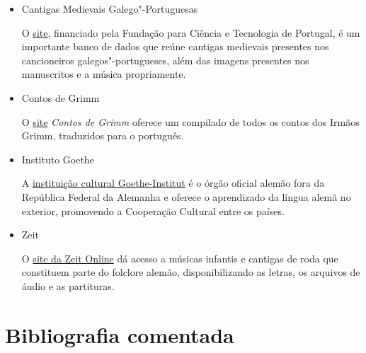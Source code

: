 \documentclass[12pt]{extarticle}
\begin{document}
\begin{itemize}
\item Cantigas Medievais Galego"-Portuguesas

O \href{https://cantigas.fcsh.unl.pt/index.asp}{site}, financiado pela Fundação para Ciência e Tecnologia de Portugal, é um importante banco de dados
que reúne cantigas medievais presentes nos cancioneiros galegos"-portugueses, além das imagens presentes 
nos manuscritos e a música propriamente.

\item Contos de Grimm

O \href{https://www.grimmstories.com/pt/grimm_contos/index}{site} \emph{Contos de Grimm} oferece um compilado de todos os contos dos Irmãos Grimm, traduzidos para o português.

\item Instituto Goethe

A \href{http://www.goethe.de/rio}{instituição cultural Goethe-Institut} é o órgão oficial alemão fora da República Federal da Alemanha e 
oferece o aprendizado da língua alemã no exterior, promovendo a Cooperação Cultural entre os países.

\item Zeit

O \href{https://www.zeit.de/serie/kinderlieder?fbclid=IwAR0YTdmrrM24sDcmak__AxviJPibv0_Bxf9sx9XkX7g-4VxcKbNbRbVPrew&utm_referrer=https\%3A\%2F\%2Fl.facebook.com\%2F}{site da Zeit Online} dá acesso a músicas infantis e cantigas de roda que constituem parte do folclore alemão, 
disponibilizando as letras, os arquivos de áudio e as partituras.
\end{itemize}


\section{Bibliografia comentada}
\end{document}
